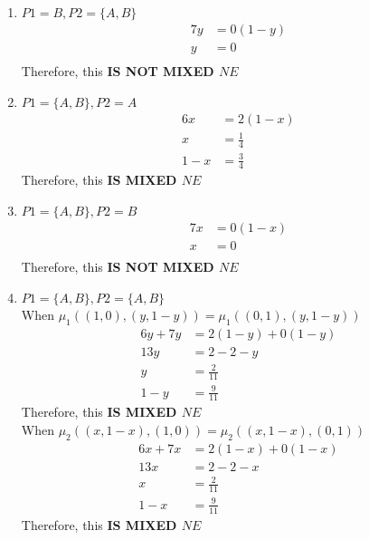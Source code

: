\documentclass[12pt, a4paper]{article}
\begin{document}
\begin{enumerate}
\item $P1 = B, P2 = \{A,B\}$\\
 \begin{subequations}
  \begin{align}
    7y &= 0(1-y)\\
     y &= 0\\
  \end{align}
\end{subequations}
Therefore, this \textbf{IS NOT MIXED $NE$}

\item $P1 = \{A,B\}, P2 = A$\\
 \begin{subequations}
  \begin{align}
    6x &= 2(1-x)\\
    x &= \frac{1}{4}\\
    1 - x &= \frac{3}{4}
  \end{align}
\end{subequations}
Therefore, this \textbf{IS MIXED $NE$}


\item $P1 = \{A,B\}, P2 = B$\\
 \begin{subequations}
  \begin{align}
    7x &= 0(1-x)\\
     x &= 0\\
  \end{align}
\end{subequations}
Therefore, this \textbf{IS NOT MIXED $NE$}


\item $P1 = \{A,B\}, P2 = \{A,B\}$\\

When $\mu_1((1,0),(y, 1-y)) = \mu_1((0,1),(y,1-y))$
 \begin{subequations}
  \begin{align}
    6y + 7y &= 2(1-y) + 0(1-y)\\
    13y &= 2 - 2-y\\
    y &= \frac{2}{11}\\
    1-y &= \frac{9}{11}
  \end{align}
\end{subequations}
Therefore, this \textbf{IS MIXED $NE$}\\

When $\mu_2((x,1-x),(1,0)) = \mu_2((x,1-x),(0,1))$
 \begin{subequations}
  \begin{align}
    6x + 7x &= 2(1-x) + 0(1-x)\\
    13x &= 2 - 2-x\\
    x &= \frac{2}{11}\\
    1-x &= \frac{9}{11}
  \end{align}
\end{subequations}
Therefore, this \textbf{IS MIXED $NE$}
\end{enumerate}
\end{document}
